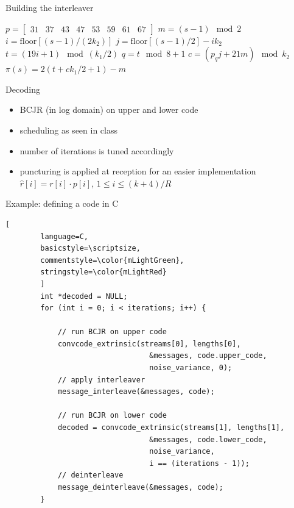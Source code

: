 \documentclass[handout,xcolor={usenames,dvipsnames},11pt]{beamer}
\begin{document}
\begin{frame}{Building the interleaver}
    \begin{algorithmic}
        \State $p = \begin{bmatrix}31 & 37 & 43 & 47 & 53 & 59 & 61 & 67\end{bmatrix}$
            \State $m = (s-1) \mod 2$
            \State $i = \text{floor}\left[(s-1)/(2k_2)\right]$
            \State $j = \text{floor}\left[(s-1)/2\right] -i k_2$
            \State $t = (19i + 1) \mod (k_1/2)$
            \State $q = t \mod 8 + 1$
            \State $c = (p_q j + 21m) \mod k_2$
            \State $\pi(s) = 2(t + c k_1/2 +1) - m$
        \EndFor
    \end{algorithmic}
\end{frame}

\begin{frame}[c]{Decoding}
    \begin{itemize}
        \item BCJR (in log domain) on upper and lower code
        \item scheduling as seen in class
        \item number of iterations is tuned accordingly
        \item puncturing is applied at reception for an easier implementation
            $\hat{r}[i] = r[i]\cdot p[i]$, $ 1 \leq i \leq (k+4)/R$
    \end{itemize}
    
\end{frame}
\begin{frame}[c,fragile]{Example: defining a code in C}
    \begin{lstlisting}[
        language=C,
        basicstyle=\scriptsize,
        commentstyle=\color{mLightGreen},
        stringstyle=\color{mLightRed}
        ]
        int *decoded = NULL;
        for (int i = 0; i < iterations; i++) {

            // run BCJR on upper code
            convcode_extrinsic(streams[0], lengths[0], 
                                 &messages, code.upper_code,
                                 noise_variance, 0);
            // apply interleaver
            message_interleave(&messages, code);

            // run BCJR on lower code
            decoded = convcode_extrinsic(streams[1], lengths[1], 
                                 &messages, code.lower_code, 
                                 noise_variance, 
                                 i == (iterations - 1));
            // deinterleave
            message_deinterleave(&messages, code);
        }
    \end{lstlisting}
\end{frame}
\end{document}
